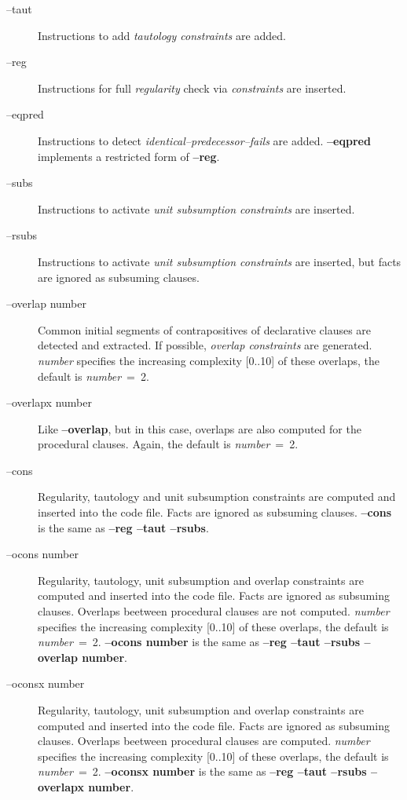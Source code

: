 \begin{description}
      \item[--taut]
           {Instructions to add {\it tautology constraints\/} are added.}
      \item[--reg]
           {Instructions for full {\it regularity\/} check via  {\it
            constraints\/} are inserted.}
      \item[--eqpred]
           {Instructions to detect {\it identical--predecessor--fails\/}
            are added. {\bf --eqpred} implements a restricted form of
            {\bf --reg}.}
      \item[--subs]
           {Instructions to activate {\it unit subsumption constraints\/}
            are inserted.}
      \item[--rsubs]
           {Instructions to activate {\it unit subsumption constraints\/}
            are inserted, but facts are ignored as subsuming clauses.}
      \item[--overlap \lb number\rb]
           {Common initial segments of contrapositives of  declarative
            clauses  are  detected  and extracted. If possible,
            {\it overlap  constraints\/}  are  generated. {\it number\/}
            specifies  the  increasing  complexity [0..10] of these
            overlaps, the default is {\it number\/}~=~2.}
      \item[--overlapx \lb number\rb]
           {Like {\bf --overlap}, but in this case, overlaps are also
            computed for  the procedural clauses. Again, the default is
            {\it number\/}~=~2.}  
      \item[--cons]
           {Regularity, tautology and unit subsumption constraints are
            computed and inserted into the code file. Facts are
            ignored as subsuming clauses. {\bf --cons} is the same as
            {\bf --reg --taut --rsubs}.}  
      \item[--ocons \lb number\rb]
           {Regularity, tautology, unit subsumption and overlap
            constraints are computed and inserted into the code
            file. Facts are 
            ignored as subsuming clauses. Overlaps beetween
            procedural clauses are not computed. {\it number\/}
            specifies  the  increasing complexity [0..10] of these
            overlaps, the default is {\it number\/}~=~2. {\bf --ocons
            \lb number\rb} is the same as {\bf --reg --taut --rsubs
            --overlap \lb number\rb}.} 
      \item[--oconsx \lb number\rb]
           {Regularity, tautology, unit subsumption and overlap
            constraints are computed and inserted into the code
            file. Facts are  ignored as subsuming clauses. Overlaps
            beetween procedural clauses are computed. {\it number\/}
            specifies  the  increasing complexity [0..10] of these
            overlaps, the default is {\it number\/}~=~2. {\bf --oconsx
            \lb number\rb} is the same as {\bf --reg --taut --rsubs
            --overlapx \lb number\rb}.} 
\end{description} 

